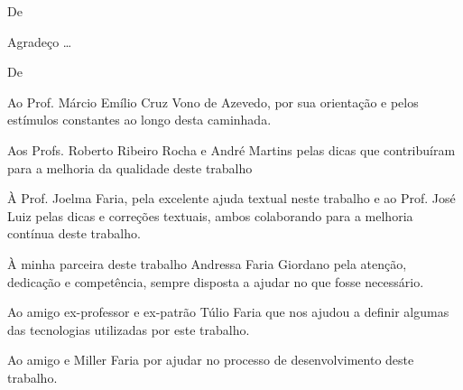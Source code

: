 \begin{agradecimentos}

De \imprimirAutorUm
\newline
\par Agradeço \ldots

\vspace*{\fill}
De \imprimirAutorDois
\newline

\par Ao Prof. Márcio Emílio Cruz Vono de Azevedo, por sua orientação e pelos estímulos constantes ao longo desta caminhada.

\par Aos Profs. Roberto Ribeiro Rocha e André Martins pelas dicas que contribuíram para a melhoria da qualidade deste trabalho 

\par À Prof. Joelma Faria, pela excelente ajuda textual neste trabalho e ao Prof. José Luiz pelas dicas e correções textuais, ambos colaborando para a melhoria contínua deste trabalho.

\par À minha parceira deste trabalho Andressa Faria Giordano pela atenção, dedicação e competência, sempre disposta a ajudar no que fosse necessário.

\par Ao amigo ex-professor e ex-patrão Túlio Faria que nos ajudou a definir algumas das tecnologias utilizadas por este trabalho.

\par Ao amigo e Miller Faria por ajudar no processo de desenvolvimento deste trabalho.

\end{agradecimentos}




